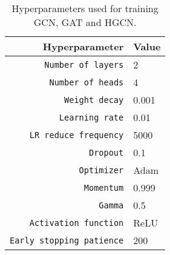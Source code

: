 \begin{table}
    \centering
    \caption{Hyperparameters used for training GCN, GAT and HGCN.}
    \label{tab:hyperparams}
    \begin{tabular}{rl}
        \toprule
        \textbf{Hyperparameter} & \textbf{Value} \\
        \midrule
        \texttt{Number of layers} & 2 \\
        \texttt{Number of heads} &  4 \\
        \texttt{Weight decay} & 0.001 \\
        \texttt{Learning rate} & 0.01 \\
        \texttt{LR reduce frequency} & 5000 \\
        \texttt{Dropout} & 0.1 \\
        \texttt{Optimizer} & Adam \\
        \texttt{Momentum} & 0.999 \\
        \texttt{Gamma} & 0.5 \\
        \texttt{Activation function} & ReLU \\
        \texttt{Early stopping patience} & 200 \\
        \bottomrule
    \end{tabular}
\end{table}
